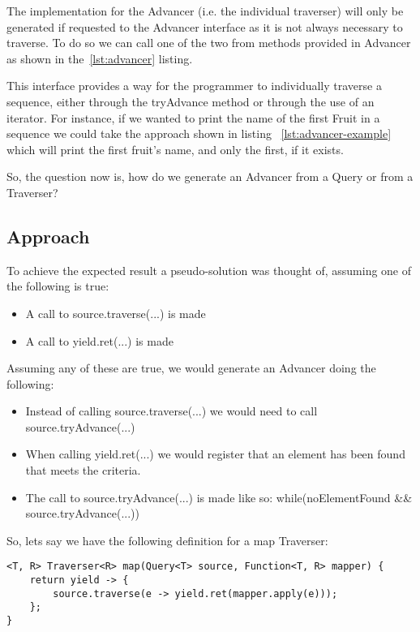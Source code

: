 The implementation for the Advancer (i.e. the individual traverser) will only be generated if requested to the Advancer interface as it is not always necessary to traverse. To do so we can call one of the two from methods provided in Advancer as shown in the~\ref{lst:advancer} listing.



This interface provides a way for the programmer to individually traverse a sequence, either through the tryAdvance method or through the use of an iterator. For instance, if we wanted to print the name of the first Fruit in a sequence we could take the approach shown in listing ~\ref{lst:advancer-example} which will print the first fruit's name, and only the first, if it exists.



So, the question now is, how do we generate an Advancer from a Query or from a Traverser?


\subsection{Approach}

To achieve the expected result a pseudo-solution was thought of, assuming one of the following is true:
\begin{itemize}
\item A call to source.traverse(...) is made
\item A call to yield.ret(...) is made
\end{itemize}


Assuming any of these are true, we would generate an Advancer doing the following:
\begin{itemize}
\item Instead of calling source.traverse(...) we would need to call source.tryAdvance(...)
\item When calling yield.ret(...) we would register that an element has been found that meets the criteria.
\item The call to source.tryAdvance(...) is made like so: while(noElementFound \&\& source.tryAdvance(...))
\end{itemize}

So, lets say we have the following definition for a map Traverser:
\begin{lstlisting}[caption={Map Traverser},label={lst:map-traverser},captionpos=b]
<T, R> Traverser<R> map(Query<T> source, Function<T, R> mapper) {
	return yield -> {
    	source.traverse(e -> yield.ret(mapper.apply(e)));
	};
}
\end{lstlisting}

